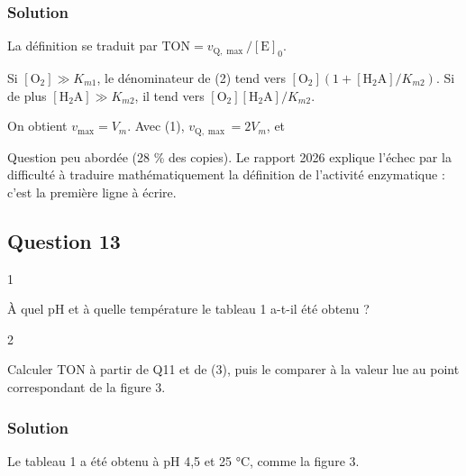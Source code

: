 \documentclass[11pt,a4paper]{article}
\newcommand{\equationajustee}[1]{%
  \sbox{\boiteequation}{$\displaystyle #1$}%
  \ifdim\wd\boiteequation>\linewidth
    \[\resizebox{\linewidth}{!}{\usebox{\boiteequation}}\]%
  \else
    \[#1\]%
  \fi}
\begin{document}
\hypertarget{solution-11}{%
\subsubsection{Solution}\label{solution-11}}

La définition se traduit par \(\mathrm{TON} = v_{\mathrm Q,\max}/[\mathrm E]_0\).

Si \([\mathrm{O_2}] \gg K_{m1}\), le dénominateur de (2) tend vers \([\mathrm{O_2}](1 + [\mathrm{H_2A}]/K_{m2})\). Si de plus \([\mathrm{H_2A}] \gg K_{m2}\), il tend vers \([\mathrm{O_2}][\mathrm{H_2A}]/K_{m2}\).

On obtient \(v_{\max} = V_m\). Avec (1), \(v_{\mathrm Q,\max} = 2V_m\), et

\equationajustee{\boxed{\mathrm{TON} = \frac{2V_m}{[\mathrm E]_0}}}

\begin{jury}

Question peu abordée (28 \% des copies). Le rapport 2026 explique l'échec par la difficulté à traduire mathématiquement la définition de l'activité enzymatique : c'est la première ligne à écrire.

\end{jury}

\hypertarget{question-13}{%
\subsection{Question 13}\label{question-13}}

\begin{indication}{1}

À quel pH et à quelle température le tableau 1 a-t-il été obtenu ?

\end{indication}

\begin{indication}{2}

Calculer TON à partir de Q11 et de (3), puis le comparer à la valeur lue au point correspondant de la figure 3.

\end{indication}

\hypertarget{solution-12}{%
\subsubsection{Solution}\label{solution-12}}

Le tableau 1 a été obtenu à pH 4,5 et 25 °C, comme la figure 3.
\end{document}
